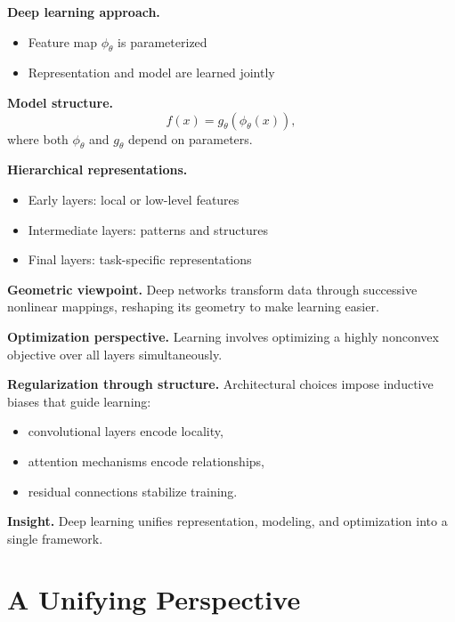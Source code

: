 \medskip

\noindent
\textbf{Deep learning approach.}
\begin{itemize}
    \item Feature map $\phi_\theta$ is parameterized
    \item Representation and model are learned jointly
\end{itemize}

\medskip

\noindent
\textbf{Model structure.}
\[
f(x) = g_\theta(\phi_\theta(x)),
\]
where both $\phi_\theta$ and $g_\theta$ depend on parameters.

\medskip

\noindent
\textbf{Hierarchical representations.}
\begin{itemize}
    \item Early layers: local or low-level features
    \item Intermediate layers: patterns and structures
    \item Final layers: task-specific representations
\end{itemize}

\medskip

\noindent
\textbf{Geometric viewpoint.}  
Deep networks transform data through successive nonlinear mappings, reshaping its geometry to make learning easier.

\medskip

\noindent
\textbf{Optimization perspective.}  
Learning involves optimizing a highly nonconvex objective over all layers simultaneously.

\medskip

\noindent
\textbf{Regularization through structure.}  
Architectural choices impose inductive biases that guide learning:
\begin{itemize}
    \item convolutional layers encode locality,
    \item attention mechanisms encode relationships,
    \item residual connections stabilize training.
\end{itemize}

\medskip

\noindent
\textbf{Insight.}  
Deep learning unifies representation, modeling, and optimization into a single framework.

\section{A Unifying Perspective}

